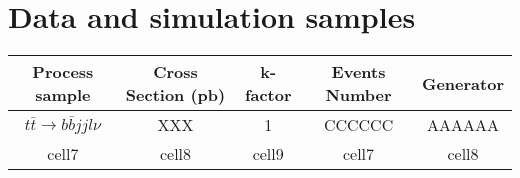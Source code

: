 

\section{Data and simulation samples}
\label{sec:DataAndMC}




\begin{center}
\begin{tabular}{ c c c c c }
\hline
Process sample & Cross Section (pb) & k-factor & Events Number & Generator \\ 
\hline
$t$$\bar{t}\rightarrow b \bar{b}jjl\nu$ & XXX & 1 & CCCCCC & AAAAAA \\
\hline
cell7 & cell8 & cell9 & cell7 & cell8 \\
\hline  
\end{tabular}
\end{center}


\FloatBarrier
